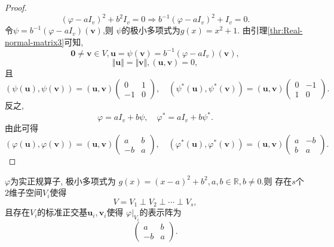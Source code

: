 \begin{proof}
  \[
    (\varphi-aI_v)^2+b^2I_v=0 \Longrightarrow
    b^{-1}(\varphi-aI_v)^2+I_v=0.
  \]
  令$\psi=b^{-1}(\varphi-aI_v)(\bm{v})$,则
  $\psi$的极小多项式为$g(x)=x^2+1$.
  由引理\ref{thr:Real-normal-matrix3}可知,
  \[
    \bm{0}\neq \bm{v}\in V, \bm{u}=\psi(\bm{v})=b^{-1}(\varphi-aI_v)(\bm{v}),
  \]
  \[
    \Vert\bm{u}\Vert=\Vert\bm{v}\Vert, (\bm{u},\bm{v})=0,
  \]
  且
  \[
     (\psi(\bm{u}),\psi(\bm{v}))=(\bm{u},\bm{v})\begin{pmatrix}
      0 & 1\\
      -1 & 0
    \end{pmatrix},\quad
    (\psi^*(\bm{u}),\psi^*(\bm{v}))=(\bm{u},\bm{v})\begin{pmatrix}
      0 & -1\\
      1 & 0
    \end{pmatrix}.
  \]
  反之,
  \[
    \varphi=aI_v+b\psi,\quad
    \varphi^*=aI_v+b\psi^*.
  \]
  由此可得
  \[
    (\varphi(\bm{u}),\varphi(\bm{v}))=(\bm{u},\bm{v})\begin{pmatrix}
      a & b\\
      -b & a
    \end{pmatrix},\quad
    (\varphi^*(\bm{u}),\varphi^*(\bm{v}))=(\bm{u},\bm{v})\begin{pmatrix}
      a & -b\\
      b & a
    \end{pmatrix}.
  \]
\end{proof}

\begin{theorem}\label{thm:Real-normal-matrix2}
   $\varphi$为实正规算子, 极小多项式为
   $g(x)=(x-a)^2+b^2, a,b\in\mathbb{R},b\neq 0$.则
   存在$s$个$2$维子空间$V_i$使得
   \[
      V=V_1\perp V_2\perp \cdots \perp V_s,
    \]
    且存在$V_i$的标准正交基$\bm{u}_i,\bm{v}_i$使得
    $\varphi|_{V_i}$的表示阵为
    \[
      \begin{pmatrix}
        a & b\\
        -b & a
      \end{pmatrix}.
    \]
\end{theorem}

